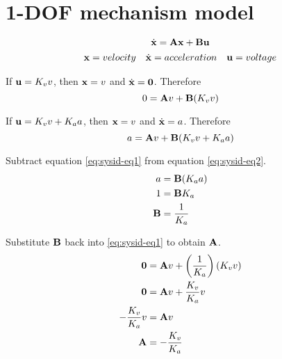\section{1-DOF mechanism model}
\begin{equation*}
  \dot{\mathbf{x}} = \mathbf{A}\mathbf{x} + \mathbf{B}\mathbf{u}
\end{equation*}
\begin{equation*}
  \begin{array}{ccc}
    \mathbf{x} = velocity & \dot{\mathbf{x}} = acceleration & \mathbf{u} = voltage
  \end{array}
\end{equation*}

If $\mathbf{u} = K_v v$, then $\mathbf{x} = v$ and $\dot{\mathbf{x}} = \mathbf{0}$.
Therefore
\begin{equation}
  0 = \mathbf{A}v + \mathbf{B}(K_v v) \label{eq:sysid-eq1}
\end{equation}

If $\mathbf{u} = K_v v + K_a a$, then $\mathbf{x} = v$ and $\dot{\mathbf{x}} = a$.
Therefore
\begin{equation}
  a = \mathbf{A}v + \mathbf{B}(K_v v + K_a a) \label{eq:sysid-eq2}
\end{equation}

Subtract equation \eqref{eq:sysid-eq1} from equation \eqref{eq:sysid-eq2}.
\begin{align*}
  a &= \mathbf{B} (K_a a) \\
  1 &= \mathbf{B} K_a \\
  \mathbf{B} &= \frac{1}{K_a}
\end{align*}

Substitute $\mathbf{B}$ back into \eqref{eq:sysid-eq1} to obtain $\mathbf{A}$.
\begin{align*}
  \mathbf{0} &= \mathbf{A}v + \left(\frac{1}{K_a}\right)(K_v v) \\
  \mathbf{0} &= \mathbf{A}v + \frac{K_v}{K_a} v \\
  -\frac{K_v}{K_a} v &= \mathbf{A}v \\
  \mathbf{A} &= -\frac{K_v}{K_a}
\end{align*}

